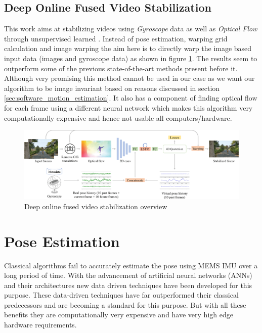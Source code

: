 \subsection{Deep Online Fused Video Stabilization}
This work aims at stabilizing videos using \textit{Gyroscope} data as well as \textit{Optical Flow} through unsupervised learned \citep{deep_opti_stab}. Instead of pose estimation, warping grid calculation and image warping the aim here is to directly warp the image based input data (images and gyroscope data) as shown in figure \ref{fig:deep_stab}. The results seem to outperform some of the previous state-of-the-art methods present before it. Although very promising this method cannot be used in our case as we want our algorithm to be image invariant based on reasons discussed in section \ref{sec:software_motion_estimation}. It also has a component of finding optical flow for each frame using a different neural network which makes this algorithm very computationally expensive and hence not usable all computers/hardware.

\begin{figure}[H]
    \centering
    \includegraphics[scale=0.066]{images/fig_chapter3/deep_stab.png}
    \caption{Deep online fused video stabilization overview \citep{deep_opti_stab}}
    \label{fig:deep_stab}
\end{figure}

\section{Pose Estimation}
\label{sec:sota_pose_est}
Classical algorithms fail to accurately estimate the pose using MEMS IMU over a long period of time. With the advancement of artificial neural networks (ANNs) and their architectures new data driven techniques have been developed for this purpose. These data-driven techniques have far outperformed their classical predecessors and are becoming a standard for this purpose. But with all these benefits they are computationally very expensive and have very high edge hardware requirements. 

